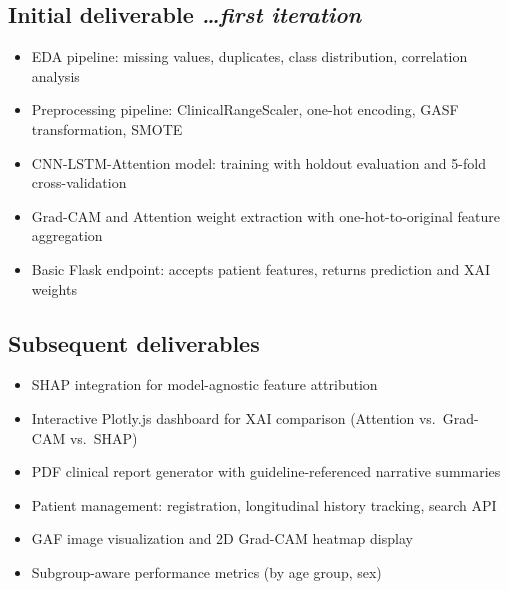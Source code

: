 \documentclass[11pt,a4paper]{article}
\newcommand{\BvrHint}[1]{%
  {\normalfont\normalsize\itshape\hfill #1}}
\begin{document}
\subsection{Initial deliverable%
  \BvrHint{\ldots first iteration}}
\begin{itemize}[leftmargin=0.7cm]
    \item EDA pipeline: missing values, duplicates, class
      distribution, correlation analysis
    \item Preprocessing pipeline: ClinicalRangeScaler, one-hot
      encoding, GASF transformation, SMOTE
    \item CNN-LSTM-Attention model: training with holdout evaluation
      and 5-fold cross-validation
    \item Grad-CAM and Attention weight extraction with
      one-hot-to-original feature aggregation
    \item Basic Flask endpoint: accepts patient features, returns
      prediction and XAI weights
\end{itemize}

\subsection{Subsequent deliverables}
\begin{itemize}[leftmargin=0.7cm]
    \item SHAP integration for model-agnostic feature attribution
    \item Interactive Plotly.js dashboard for XAI comparison
      (Attention vs.\ Grad-CAM vs.\ SHAP)
    \item PDF clinical report generator with guideline-referenced
      narrative summaries
    \item Patient management: registration, longitudinal history
      tracking, search API
    \item GAF image visualization and 2D Grad-CAM heatmap display
    \item Subgroup-aware performance metrics (by age group, sex)
\end{itemize}

\end{document}
